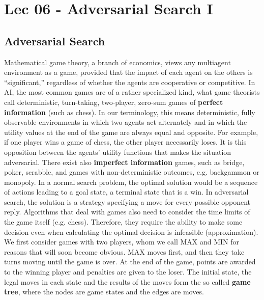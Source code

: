 \chapter{Lec 06 - Adversarial Search I}

\section{Adversarial Search}
Mathematical game theory, a branch of economics, views any multiagent environment as a game, provided that the impact of each agent on the others is “significant,” regardless of whether the agents are cooperative or competitive. In AI, the most common games are of a rather specialized kind, what game theorists call deterministic, turn-taking, two-player, zero-sum games of \textbf{perfect information} (such as chess). In our terminology, this means deterministic, fully observable environments in which two agents act alternately and in which the utility values at the end of the game are always equal and opposite. For example, if one player wins a game of chess, the other player necessarily loses. It is this opposition between the agents’ utility functions that makes the situation adversarial. There exist also \textbf{imperfect information} games, such as bridge, poker, scrabble, and games with non-deterministic outcomes, e.g. backgammon or monopoly.
\newline\newline
In a normal search problem, the optimal solution would be a sequence of actions leading to a goal state, a terminal state that is a win. In adversarial search, the solution is a strategy specifying a move for every possible opponent reply. Algorithms that deal with games also need to consider the time limits of the game itself (e.g. chess). Therefore, they require the ability to make some decision even when calculating the optimal decision is infeasible (approximation).\newline\newline
We first consider games with two players, whom we call MAX and MIN for reasons that will soon become obvious. MAX moves first, and then they take turns moving until the game is over. At the end of the game, points are awarded to the winning player and penalties are given to the loser.\newline\newline
The initial state, the legal moves in each state and the results of the moves form the so called \textbf{game tree}, where the nodes are game states and the edges are moves.
